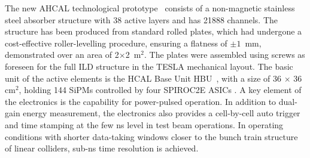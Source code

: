 The new AHCAL technological prototype~\cite{Sefkow:2018rhp} consists of a non-magnetic stainless steel absorber structure with 38 active layers and has 21888 channels. 
The structure has been produced from standard rolled plates, which had undergone a cost-effective roller-levelling procedure, ensuring a flatness of $\pm 1$~mm, demonstrated over an area of 2$\times$2~m$^2$. The plates were assembled using screws as foreseen for the full ILD structure in the TESLA mechanical layout. 
The basic unit of the active elements is the HCAL Base Unit HBU~\cite{Reinecke:2013zua}, with a size of 36 $\times$ 36 cm$^2$, holding 144 SiPMs controlled by four SPIROC2E ASICs \cite{Bouchel:2011zz}.  A key element of the electronics is the capability for power-pulsed operation.
In addition to dual-gain energy measurement, the electronics also provides a cell-by-cell auto trigger and time stamping at the few ns level in test beam operations. In operating conditions with shorter data-taking windows closer to the bunch train structure of linear colliders, sub-ns time resolution is achieved. 

